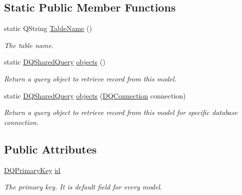 \subsection*{Static Public Member Functions}
\begin{DoxyCompactItemize}
\item 
\hypertarget{classDQModel_aaa91eee782f3562b990b3b30828847aa}{
static QString \hyperlink{classDQModel_aaa91eee782f3562b990b3b30828847aa}{TableName} ()}
\label{classDQModel_aaa91eee782f3562b990b3b30828847aa}

\begin{DoxyCompactList}\small\item\em The table name. \item\end{DoxyCompactList}\item 
static \hyperlink{classDQSharedQuery}{DQSharedQuery} \hyperlink{classDQModel_a577a69bf134bad26792408f7c909cfb3}{objects} ()
\begin{DoxyCompactList}\small\item\em Return a query object to retrieve record from this model. \item\end{DoxyCompactList}\item 
static \hyperlink{classDQSharedQuery}{DQSharedQuery} \hyperlink{classDQModel_a00c41ffc96fcd6ca420c98b7c7830756}{objects} (\hyperlink{classDQConnection}{DQConnection} connection)
\begin{DoxyCompactList}\small\item\em Return a query object to retrieve record from this model for specific database connection. \item\end{DoxyCompactList}\end{DoxyCompactItemize}
\subsection*{Public Attributes}
\begin{DoxyCompactItemize}
\item 
\hypertarget{classDQModel_ab686576bf7111eca518d68f56ab19598}{
\hyperlink{classDQPrimaryKey}{DQPrimaryKey} \hyperlink{classDQModel_ab686576bf7111eca518d68f56ab19598}{id}}
\label{classDQModel_ab686576bf7111eca518d68f56ab19598}

\begin{DoxyCompactList}\small\item\em The primary key. It is default field for every model. \item\end{DoxyCompactList}\end{DoxyCompactItemize}


